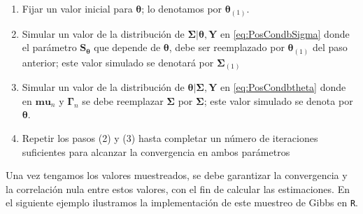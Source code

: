 \documentclass[
  10pt,
  spanish,
]{book}
\providecommand{\tightlist}{%
  \setlength{\itemsep}{0pt}\setlength{\parskip}{0pt}}
\theoremstyle{definition}
\theoremstyle{definition}
\theoremstyle{definition}
\theoremstyle{definition}
\theoremstyle{remark}
\begin{document}
\begin{enumerate}
\def\labelenumi{\arabic{enumi}.}
\tightlist
\item
  Fijar un valor inicial para \(\boldsymbol \theta\); lo denotamos por \(\boldsymbol \theta_{(1)}\).
\item
  Simular un valor de la distribución de \(\boldsymbol \Sigma|\boldsymbol \theta,\mathbf{Y}\) en \eqref{eq:PosCondbSigma} donde el parámetro \(\mathbf{S_\mathbf{\boldsymbol \theta}}\) que depende de \(\boldsymbol \theta\), debe ser reemplazado por \(\boldsymbol \theta_{(1)}\) del paso anterior; este valor simulado se denotará por \(\boldsymbol \Sigma_{(1)}\)
\item
  Simular un valor de la distribución de \(\boldsymbol \theta|\boldsymbol \Sigma,\mathbf{Y}\) en \eqref{eq:PosCondbtheta} donde en \(\mathbf{mu}_n\) y \(\boldsymbol \Gamma_n\) se debe reemplazar \(\boldsymbol \Sigma\) por \(\boldsymbol \Sigma\); este valor simulado se denota por \(\boldsymbol \theta\).
\item
  Repetir los pasos (2) y (3) hasta completar un número de iteraciones suficientes para alcanzar la convergencia en ambos parámetros
\end{enumerate}

Una vez tengamos los valores muestreados, se debe garantizar la convergencia y la correlación nula entre estos valores, con el fin de calcular las estimaciones. En el siguiente ejemplo ilustramos la implementación de este muestreo de Gibbs en \texttt{R}.
\end{document}
